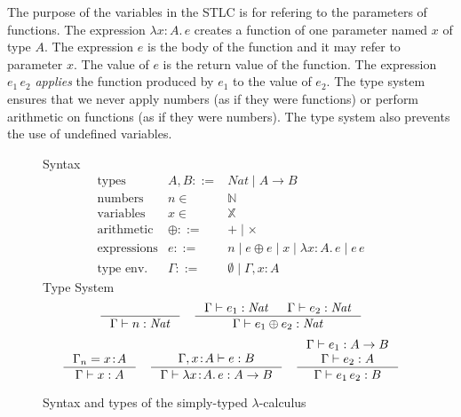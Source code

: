 \documentclass{tufte-handout}
\newcommand{\LAM}[1]{\lambda #1.\,}
\newcommand{\APP}[0]{\,}
\newcommand{\of}[0]{\!:\!}
\newcommand{\NATTY}[0]{\mathit{Nat}}
\newcommand{\VAR}[0]{\mathbb{X}}
\begin{document}
The purpose of the variables in the STLC is for refering to the
parameters of functions. The expression $\LAM{x\of A}e$ creates a
function of one parameter named $x$ of type $A$. The expression $e$ is
the body of the function and it may refer to parameter $x$.  The value
of $e$ is the return value of the function. The expression $e_1 \APP
e_2$ \emph{applies} the function produced by $e_1$ to the value of
$e_2$.  The type system ensures that we never apply numbers (as if
they were functions) or perform arithmetic on functions (as if they
were numbers). The type system also prevents the use of undefined
variables.


\begin{figure}[tbp]
\noindent Syntax
\[
\begin{array}{lrl}
 \text{types} & A,B ::= & \NATTY \mid A \to B \\
 \text{numbers}& n \in & \mathbb{N}  \\
  \text{variables}& x \in & \VAR  \\
 \text{arithmetic} & \oplus ::= & + \mid \times \\
 \text{expressions}& e ::=& n \mid e \oplus e
   \mid x \mid \LAM{x\of A} e \mid e \APP e \\
 \text{type env.} & \Gamma ::= & \emptyset \mid \Gamma,x\of A
\end{array}
\]
Type System
\begin{gather*}
  \inference{}{\Gamma \vdash n : \NATTY}
  \quad
  \inference{\Gamma \vdash e_1 : \NATTY & \Gamma \vdash e_2 : \NATTY}
            {\Gamma \vdash e_1 \oplus e_2 : \NATTY}
  \\[1ex]
  \inference{\Gamma_n = x\of A}{\Gamma \vdash x : A}
  \quad
  \inference{\Gamma,x\of A \vdash e : B}
            {\Gamma \vdash \LAM{x\of A}e : A \to B}
  \quad
  \inference{\Gamma \vdash e_1 : A \to B \\ \Gamma \vdash e_2 : A}
            {\Gamma \vdash e_1 \APP e_2 : B}
\end{gather*}
\caption{Syntax and types of the simply-typed $\lambda$-calculus}
\label{fig:stlc}
\end{figure}
\end{document}

